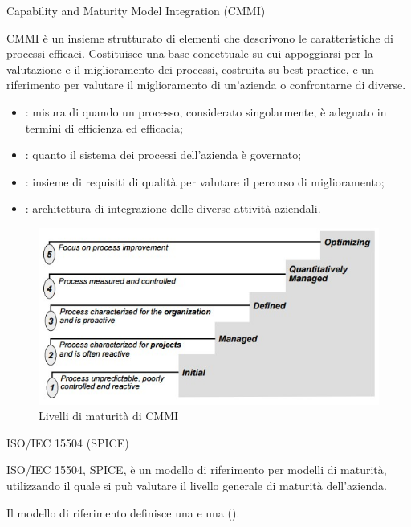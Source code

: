 \par{Capability and Maturity Model Integration (CMMI)}
\label{par:capability_and_maturity_model_integration}

CMMI è un insieme strutturato di elementi che descrivono le caratteristiche di
processi efficaci. Costituisce una base concettuale su cui appoggiarsi per la
valutazione e il miglioramento dei processi, costruita su best-practice, e un
riferimento per valutare il miglioramento di un'azienda o confrontarne di
diverse.

\begin{itemize}
  \item {}: misura di quando un processo, considerato
    singolarmente, è adeguato in termini di efficienza ed efficacia;
  \item {}: quanto il sistema dei processi dell'azienda è
    governato;
  \item {}: insieme di requisiti di qualità per valutare il percorso
    di miglioramento;
  \item {}: architettura di integrazione delle diverse
    attività aziendali.
\end{itemize}

\begin{figure}[h!]
  \centering
  \includegraphics[scale=0.5]{imgs/cmmi_maturity_level}
  \caption{Livelli di maturità di CMMI}
\end{figure}

\par{ISO/IEC 15504 (SPICE)}
\label{par:spice}

ISO/IEC 15504,  SPICE, è un modello di riferimento per modelli di
maturità, utilizzando il quale si può valutare il livello generale di maturità
dell'azienda.

Il modello di riferimento definisce una  e una
 ().

